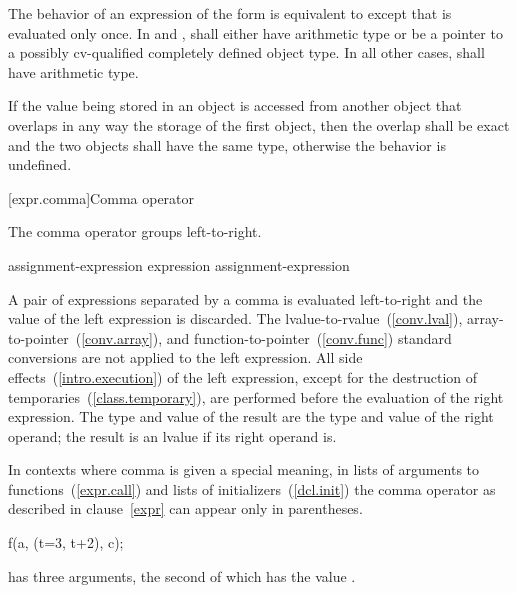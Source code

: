 \pnum
The behavior of an expression of the form  \tcode{=}
 is equivalent to    except
that  is evaluated only once. In \tcode{+=} and \tcode{-=},
 shall either have arithmetic type or be a pointer to a
possibly cv-qualified completely defined object type. In all other
cases,  shall have arithmetic type.

\pnum
If the value being stored in an object is accessed from another object that
overlaps in any way the storage of the first object, then the overlap shall be
exact and the two objects shall have the same type, otherwise the behavior is
undefined.

[expr.comma]{Comma operator}%
%
%
%
%

\pnum
The comma operator groups left-to-right.

\begin{bnf}
\br
    assignment-expression\br
    expression \terminal{,} assignment-expression
\end{bnf}

A pair of expressions separated by a comma is evaluated left-to-right
and the value of the left expression is discarded. The
lvalue-to-rvalue~(\ref{conv.lval}), array-to-pointer~(\ref{conv.array}),
and function-to-pointer~(\ref{conv.func}) standard conversions are not
applied to the left expression.
%
All side effects~(\ref{intro.execution})
of the left expression, except for the destruction of
temporaries~(\ref{class.temporary}), are performed before the evaluation of
the right expression. The type and value of the
result are the type and value of the right operand; the result is
an lvalue if its right operand is.

\pnum
In contexts where comma is given a special meaning, \enterexample in
lists of arguments to functions~(\ref{expr.call}) and lists of
initializers~(\ref{dcl.init}) \exitexample the comma operator as
described in clause~\ref{expr} can appear only in parentheses.
\enterexample 

\begin{codeblock}
f(a, (t=3, t+2), c);
\end{codeblock}

has three arguments, the second of which has the value
.
\exitexample 

